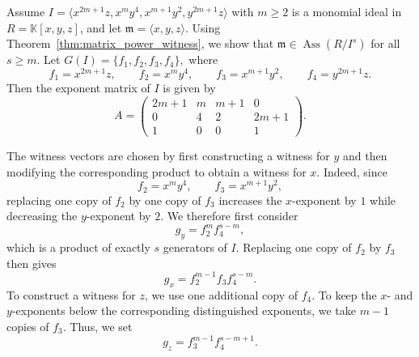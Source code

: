\documentclass[11pt]{amsart}   %
\begin{document}
\begin{exm} \label{Example-2} 
Assume  $I=\langle x^{2m+1}z,x^my^4,x^{m+1}y^2,y^{2m+1}z\rangle$
with $m\geq2$ is a monomial ideal in $R=\mathbb K[x,y,z]$, and let
 $\mathfrak{m}=\langle x,y,z\rangle.$ Using Theorem~\ref{thm:matrix_power_witness}, we show that
$\mathfrak{m}\in\operatorname{Ass}(R/I^s)$ for all $s\geq m$.
Let $G(I)=\{f_1,f_2,f_3,f_4\},$  where
\[
f_1=x^{2m+1}z,\qquad
f_2=x^my^4,\qquad
f_3=x^{m+1}y^2,\qquad
f_4=y^{2m+1}z.
\]
 Then  the  exponent matrix of $I$  is given by
\[
A=
\begin{pmatrix}
2m+1&m&m+1&0\\
0&4&2&2m+1\\
1&0&0&1
\end{pmatrix}.
\]

The witness vectors are chosen by first constructing a witness for $y$ and then modifying the corresponding product to obtain a witness for $x$. Indeed, since
\[
f_2=x^my^4,\qquad f_3=x^{m+1}y^2,
\]
replacing one copy of $f_2$ by one copy of $f_3$ increases the $x$-exponent by $1$ while decreasing the $y$-exponent by $2$. We therefore first consider
\[
g_y=f_2^m f_4^{s-m},
\]
which is a product of exactly $s$ generators of $I$. Replacing one copy of $f_2$ by $f_3$ then gives
\[
g_x=f_2^{m-1}f_3f_4^{s-m}.
\]
To construct a witness for $z$, we use one additional copy of $f_4$.
To keep the $x$- and $y$-exponents below the corresponding
distinguished exponents, we take $m-1$ copies of $f_3$. Thus, we set
\[
g_z=f_3^{m-1}f_4^{s-m+1}.
\]


\end{exm}
\end{document}
